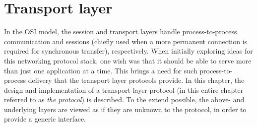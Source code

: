 \chapter{Transport layer}
In the OSI model, the session and transport layers handle process-to-process communication and sessions (chiefly used when a more permanent connection is required for synchronous transfer), respectively. When initially exploring ideas for this networking protocol stack, one wish was that it should be able to serve more than just one application at a time. This brings a need for such process-to-process delivery that the transport layer protocols provide. In this chapter, the design and implementation of a transport layer protocol (in this entire chapter referred to as \textit{the protocol}) is described. To the extend possible, the above- and underlying layers are viewed as if they are unknown to the protocol, in order to provide a generic interface.